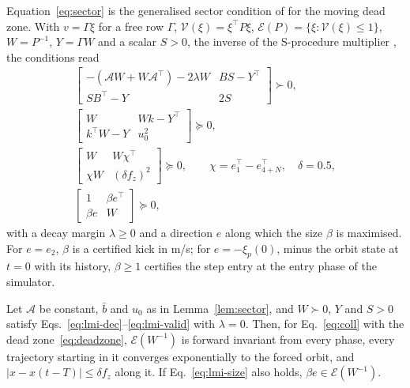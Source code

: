 Equation~\eqref{eq:sector} is the generalised sector condition of \citet{gomesdasilva2005antiwindup} for the moving dead zone. With $v=\Gamma\xi$ for a free row $\Gamma$, $\mathcal V(\xi)=\xi^\top P\xi$, $\mathcal E(P)=\{\xi:\mathcal V(\xi)\le1\}$, $W=P^{-1}$, $Y=\Gamma W$ and a scalar $S>0$, the inverse of the S-procedure multiplier \citep{tarbouriech2009antiwindup,tarbouriech2011book}, the conditions read
\begin{gather}
\begin{bmatrix}-(\mathcal AW+W\mathcal A^\top)-2\lambda W & BS-Y^\top\\ SB^\top-Y & 2S\end{bmatrix}\succ0, \label{eq:lmi-dec}\\
\begin{bmatrix}W & Wk-Y^\top\\ k^\top W-Y & u_0^2\end{bmatrix}\succeq0, \label{eq:lmi-incl}\\
\begin{bmatrix}W & W\chi^\top\\ \chi W & (\delta f_z)^2\end{bmatrix}\succeq0,\qquad \chi=e_1^\top-e_{4+N}^\top,\quad \delta=0.5, \label{eq:lmi-valid}\\
\begin{bmatrix}1 & \beta e^\top\\ \beta e & W\end{bmatrix}\succeq0, \label{eq:lmi-size}
\end{gather}
with a decay margin $\lambda\ge0$ and a direction $e$ along which the size $\beta$ is maximised. For $e=e_2$, $\beta$ is a certified kick in m/s; for $e=-\xi_p(0)$, minus the orbit state at $t=0$ with its history, $\beta\ge1$ certifies the step entry at the entry phase of the simulator.

\begin{proposition}\label{prop:c2}
Let $\mathcal A$ be constant, $\bar b$ and $u_0$ as in Lemma~\ref{lem:sector}, and $W\succ0$, $Y$ and $S>0$ satisfy Eqs.~\eqref{eq:lmi-dec}--\eqref{eq:lmi-valid} with $\lambda=0$. Then, for Eq.~\eqref{eq:coll} with the dead zone~\eqref{eq:deadzone}, $\mathcal E(W^{-1})$ is forward invariant from every phase, every trajectory starting in it converges exponentially to the forced orbit, and $\lvert x-x(t-T)\rvert\le\delta f_z$ along it. If Eq.~\eqref{eq:lmi-size} also holds, $\beta e\in\mathcal E(W^{-1})$.
\end{proposition}

